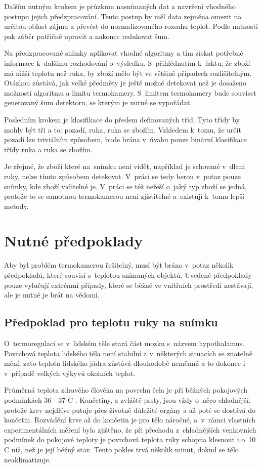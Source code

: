 Dalším nutným krokem je průzkum nasnímaných dat a navržení vhodného postupu jejich předzpracování. Tento postup by měl data zejména omezit na určitou oblast zájmu a převést do normalizovaného rozsahu teplot. Podle nutnosti pak záběr patřičně upravit a nakonec redukovat šum.

Na předzpracované snímky aplikovat vhodné algoritmy a tím získat potřebné informace k~dalšímu rozhodování o~výsledku. S~přihlédnutím k~faktu, že zboží má nižší teplotu než ruka, by zboží mělo být ve většině případech rozlišitelným. Otázkou zůstává, jak velké předměty je ještě možné detekovat než je dosaženo možností algoritmu a limitu termokamery. S~limitem termokamery bude souviset generovaný šum detektoru, se kterým je nutné se vypořádat. 

Posledním krokem je klasifikace do předem definovaných tříd. Tyto třídy by mohly být tři a to: pozadí, ruka, ruka se zbožím. Vzhledem k~tomu, že určit pozadí lze triviálním způsobem, bude brána v~úvahu pouze binární klasifikace třídy ruka a ruka se zbožím.

Je zřejmé, že zboží které na~snímku není vidět, například je schované v~dlani ruky, nelze tímto způsobem detekovat. V~práci se tedy berou v~potaz pouze snímky, kde zboží viditelné je. V~práci se též neřeší o~jaký typ zboží se jedná, protože to se samotnou termokamerou není zjistitelné a~existují k~tomu lepší metody. 

\section{Nutné předpoklady}
Aby byl problém termokamerou řešitelný, musí být bráno v~potaz několik předpokladů, které souvisí s~teplotou snímaných objektů. Uvedené předpoklady pouze vylučují extrémní případy, které se běžně ve vnitřních prostředí nestávají, ale je nutné je brát na vědomí.

	\subsection{Předpoklad pro teplotu ruky na snímku}\label{section:hand_temp_prereq}
	O~termoregulaci se v~lidském těle stará část mozku s~názvem hypothalamus.  Povrchová teplota lidského těla není stabilní a v~některých situacích se znatelně mění, zato teplota lidského jádra zůstává dlouhodobě neměnná a to dokonce i v~případě velkých výkyvů okolních teplot. \cite{pvrikopa2011navrhnvete}
    
    Průměrná teplota zdravého člověka na povrchu čela je při běžných pokojových podmínkách 36 - 37 \textdegree{}C \cite{mlvcak2007mapovani}. Končetiny, a zvláště prsty, jsou vždy o~něco chladnější, protože krev nejdříve putuje přes životně důležité orgány a až poté se dostává do končetin. Rozvádění krve až do končetin je pro tělo náročné, a~v~rámci vlastních experimentálních měření bylo zjištěno, že při přechodu z~chladnějších venkovních podmínek do pokojové teploty je povrchová teplota ruky schopna klesnout i o~10 \textdegree{}C níž, než je její běžný stav. Tento pokles trvá několik minut, dokud se tělo neaklimatizuje.
    
